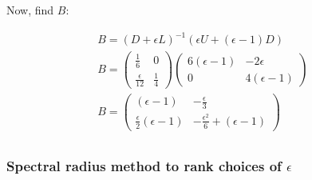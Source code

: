 \documentclass[../main.tex]{subfiles}
\begin{document}
    Now, find $B$:
    \begin{center*}
        \begin{align*}
            & B = (D + \epsilon L)^{-1}(\epsilon U + (\epsilon - 1)D) && \\
            & B = \begin{pmatrix}
                \frac{1}{6} & 0 \\
                \frac{\epsilon}{12} & \frac{1}{4}
            \end{pmatrix} \begin{pmatrix}
                6(\epsilon - 1) & -2\epsilon \\
                0 & 4(\epsilon - 1)
            \end{pmatrix} && \\
            & B = \begin{pmatrix}
                (\epsilon - 1) & -\frac{\epsilon}{3} \\
                \frac{\epsilon}{2}(\epsilon - 1) & -\frac{\epsilon^{2}}{6} + (\epsilon - 1)
            \end{pmatrix} && \\
        \end{align*}
    \end{center*}

    \subsubsection{Spectral radius method to rank choices of $\epsilon$}\label{subsubsec:spectral-radius-of-b}
\end{document}
